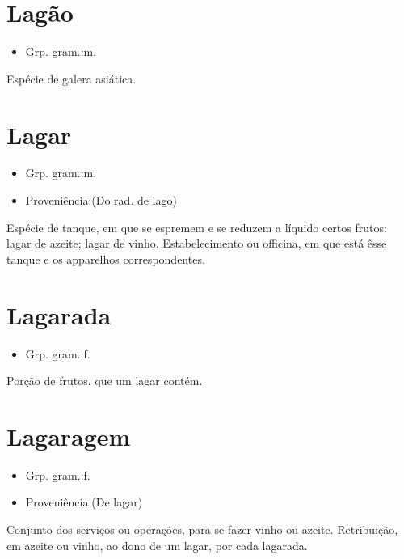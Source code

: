 \section{Lagão}
\begin{itemize}
\item {Grp. gram.:m.}
\end{itemize}
Espécie de galera asiática.
\section{Lagar}
\begin{itemize}
\item {Grp. gram.:m.}
\end{itemize}
\begin{itemize}
\item {Proveniência:(Do rad. de \textunderscore lago\textunderscore )}
\end{itemize}
Espécie de tanque, em que se espremem e se reduzem a líquido certos frutos: \textunderscore lagar de azeite\textunderscore ; \textunderscore lagar de vinho\textunderscore .
Estabelecimento ou officina, em que está êsse tanque e os apparelhos correspondentes.
\section{Lagarada}
\begin{itemize}
\item {Grp. gram.:f.}
\end{itemize}
Porção de frutos, que um lagar contém.
\section{Lagaragem}
\begin{itemize}
\item {Grp. gram.:f.}
\end{itemize}
\begin{itemize}
\item {Proveniência:(De \textunderscore lagar\textunderscore )}
\end{itemize}
Conjunto dos serviços ou operações, para se fazer vinho ou azeite.
Retribuição, em azeite ou vinho, ao dono de um lagar, por cada lagarada.
